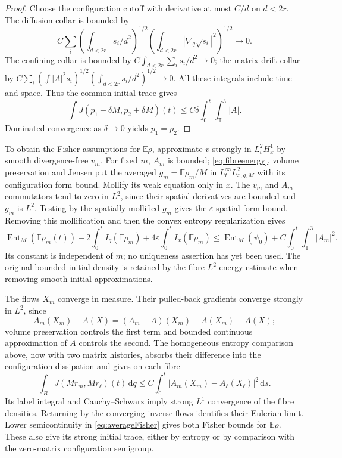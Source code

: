 \documentclass[11pt]{article}
\numberwithin{equation}{section}
\newcommand{\T}{\mathbb T^3}
\newcommand{\E}{\mathbb E}
\newcommand{\dd}{\,\mathrm d}
\newcommand{\Ent}{\operatorname{Ent}_M}
\newcommand{\grad}{\nabla}
\begin{document}
\begin{proof}
Choose the configuration cutoff with derivative at most $C/d$ on
$d<2r$. The diffusion collar is bounded by
\[
 C\sum_i\left(\int_{d<2r}s_i/d^2\right)^{1/2}
             \left(\int_{d<2r}|\grad_q\sqrt{s_i}|^2\right)^{1/2}\to0.
\]
The confining collar is bounded by $C\int_{d<2r}\sum_i s_i/d^2\to0$;
the matrix-drift collar by
$C\sum_i(\int|A|^2s_i)^{1/2}(\int_{d<2r}s_i/d^2)^{1/2}\to0$.
All these integrals include time and space. Thus the common initial trace gives
\[
 \int J(p_1+\delta M,p_2+\delta M)(t)
       \leq C\delta\int_0^t\int_\T|A|.
\]
Dominated convergence as $\delta\to0$ yields $p_1=p_2$.
\end{proof}

To obtain the Fisher assumptions for $\E\rho$, approximate $v$ strongly in
$L^2_tH^1_x$ by smooth divergence-free $v_m$. For fixed $m$, $A_m$ is bounded;
\eqref{eq:fibreenergy}, volume preservation and Jensen put the averaged
$g_m=\E\rho_m/M$ in $L^\infty_tL^2_{x,q,M}$ with its configuration form bound.
Mollify its weak equation only in $x$. The $v_m$ and $A_m$ commutators tend
to zero in $L^2$, since their spatial derivatives are bounded and $g_m$ is
$L^2$. Testing by the spatially mollified $g_m$ gives the $\varepsilon$
spatial form bound. Removing this mollification and then the convex entropy
regularization gives
\begin{equation}\label{eq:averageFisher}
 \Ent(\E\rho_m(t))+2\int_0^t I_q(\E\rho_m)
 +4\varepsilon\int_0^t I_x(\E\rho_m)
 \leq\Ent(\psi_0)+C\int_0^t\int_\T|A_m|^2.
\end{equation}
Its constant is independent of $m$; no uniqueness assertion has yet been used.
The original bounded initial density is retained by the fibre $L^2$ energy
estimate when removing smooth initial approximations.

The flows $X_m$ converge in measure. Their pulled-back gradients converge
strongly in $L^2$, since
\[
 A_m(X_m)-A(X)=(A_m-A)(X_m)+A(X_m)-A(X);
\]
volume preservation controls the first term and bounded continuous
approximation of $A$ controls the second. The homogeneous entropy comparison
above, now with two matrix histories, absorbs their difference into the
configuration dissipation and gives on each fibre
\[
 \int_B J(Mr_m,Mr_\ell)(t)\dd q
 \leq C\int_0^t|A_m(X_m)-A_\ell(X_\ell)|^2\dd s.
\]
Its label integral and Cauchy--Schwarz imply strong $L^1$ convergence of the
fibre densities. Returning by the converging inverse flows identifies their
Eulerian limit. Lower semicontinuity in \eqref{eq:averageFisher} gives both
Fisher bounds for $\E\rho$. These also give its strong initial trace, either
by entropy or by comparison with the zero-matrix configuration semigroup.
\end{document}
